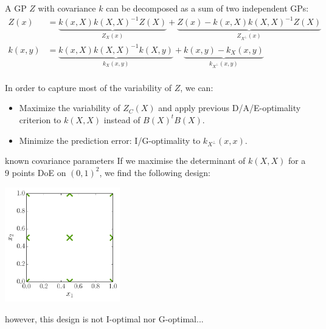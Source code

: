 \documentclass{beamer}
\begin{document}
\begin{frame}{}
A GP $Z$ with covariance $k$ can be decomposed as a sum of two independent GPs:
\begin{equation*}
	\begin{split}
	Z(x) & = \underbrace{k(x,X)k(X,X)^{-1}Z(X)}_{Z_X(x)} + \underbrace{Z(x) - k(x,X)k(X,X)^{-1}Z(X)}_{Z_{X^\perp}(x)}\\
	k(x,y) &= \underbrace{k(x,X)k(X,X)^{-1}k(X,y)}_{k_X(x,y)} + \underbrace{k(x,y) - k_X(x,y)}_{k_{X^\perp}(x,y)}
	\end{split}
\end{equation*}
\ \\
In order to capture most of the variability of $Z$, we can:
\begin{itemize}
	\item Maximize the variability of $Z_C(X)$ and apply previous D/A/E-optimality criterion to $k(X,X)$ instead of $B(X)^tB(X)$.
	\item Minimize the prediction error: I/G-optimality to $k_{X^\perp}(x,x)$.
\end{itemize}
\end{frame}

\begin{frame}{known covariance parameters}
If we maximise the determinant of $k(X,X)$ for a 9 points DoE on $(0,1)^2$, we find the following design:
\begin{center}
\includegraphics[height=5cm]{figures/python/opt_XD}
\end{center}
however, this design is not I-optimal nor G-optimal...
\end{frame}
\end{document}
